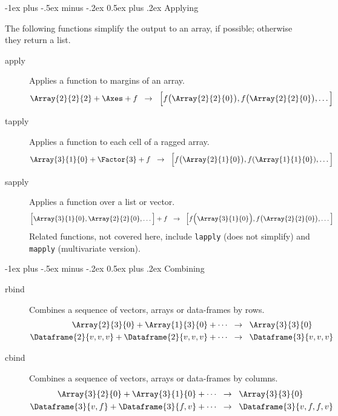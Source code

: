 \documentclass[a4paper,landscape]{article}
\makeatletter
\renewcommand{\section}{\@startsection{section}{1}{0mm}%
                                {-1ex plus -.5ex minus -.2ex}%
                                {0.5ex plus .2ex}%
                                {\normalfont\large\bfseries}}
\newcommand{\Maps}{\;\;\rightarrow \;\;}
\makeatother
\begin{document}
\begin{multicols*}{3}
\begin{description}
\end{description}

\section{Applying}

The following functions simplify the output to an array, if possible;
otherwise they return a list.

\begin{description}

\item[apply] Applies a function to margins of an array.
  \[
  \Array{2}{2}{2} + \Axes + f \Maps
  \List{f\big(\Array{2}{2}{0}\big),f\big(\Array{2}{2}{0}\big),\dots}
  \]

\item[tapply] Applies a function to each cell of a ragged array.
  \[
  \Array{3}{1}{0} + \Factor{3} + f
  \Maps \List{f\big(\Array{2}{1}{0}\big),f(\Array{1}{1}{0}),\dots}
  \]

\item[sapply] Applies a function over a list or vector.
  \[
  \List{\Array{3}{1}{0},\Array{2}{2}{0},\dots} + f \Maps
  \List{f\Big(\Array{3}{1}{0}\Big),f\big(\Array{2}{2}{0}\big),\dots}
  \]
  Related functions, not covered here, include \verb!lapply! (does not
  simplify) and \verb!mapply! (multivariate version).

\end{description}

\section{Combining}

\begin{description}

\item[rbind] Combines a sequence of vectors, arrays or data-frames by rows.
  \begin{align*}
    \Array{2}{3}{0} + \Array{1}{3}{0} + \cdots &\Maps \Array{3}{3}{0} \\
    \Dataframe{2}{v,v,v} + \Dataframe{2}{v,v,v} + \cdots
                                               &\Maps \Dataframe{3}{v,v,v}
  \end{align*}

\item[cbind] Combines a sequence of vectors, arrays or data-frames by
  columns.
  \begin{align*}
    \Array{3}{2}{0} + \Array{3}{1}{0} + \cdots &\Maps \Array{3}{3}{0} \\
    \Dataframe{3}{v,f} + \Dataframe{3}{f,v} + \cdots
                                               &\Maps \Dataframe{3}{v,f,f,v}
  \end{align*}


\end{description}
\end{multicols*}
\end{document}
